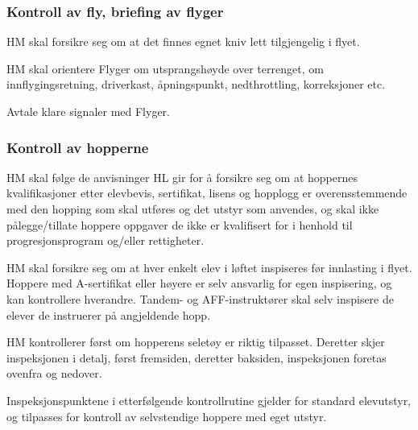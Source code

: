 \subsubsection{Kontroll av fly, briefing av flyger}
HM skal forsikre seg om at det finnes egnet kniv lett tilgjengelig i flyet.

HM skal orientere Flyger om utsprangshøyde over terrenget, om innflygingsretning, driverkast, åpningspunkt, nedthrottling, korreksjoner etc.

Avtale klare signaler med Flyger.

\subsubsection{Kontroll av hopperne}
HM skal følge de anvisninger HL gir for å forsikre seg om at hoppernes kvalifikasjoner etter elevbevis, sertifikat, lisens og hopplogg er overensstemmende med den hopping som skal utføres og det utstyr som anvendes, og skal ikke pålegge/tillate hoppere oppgaver de ikke er kvalifisert for i henhold til progresjonsprogram og/eller rettigheter.

HM skal forsikre seg om at hver enkelt elev i løftet inspiseres før innlasting i flyet. Hoppere med A-sertifikat eller høyere er selv ansvarlig for egen inspisering, og kan kontrollere hverandre. Tandem- og AFF-instruktører skal selv inspisere de elever de instruerer på angjeldende hopp.

HM kontrollerer først om hopperens seletøy er riktig tilpasset. Deretter skjer inspeksjonen i detalj, først fremsiden, deretter baksiden, inspeksjonen foretas ovenfra og nedover.

Inspeksjonspunktene i etterfølgende kontrollrutine gjelder for standard elevutstyr, og tilpasses for kontroll av selvstendige hoppere med eget utstyr.

